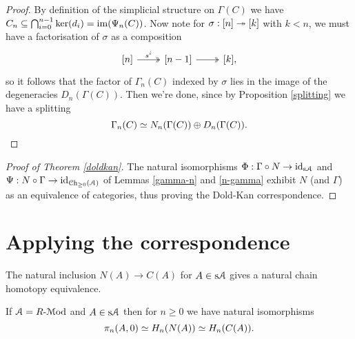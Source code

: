 \begin{proof}
  By definition of the simplicial structure on $\Gamma(C)$ we have
  $C_n \subseteq \bigcap_{i=0}^{n-1} \ker(d_i) = \operatorname{im}(\Psi_n(C))$. Now
  note for $\sigma : [n] \twoheadrightarrow [k]$ with $k < n$, we must have a
  factorisation of $\sigma$ as a composition
  \[
  \begin{tikzcd}
    {[n]} \ar[twoheadrightarrow]{r}{s^i} & {[n-1]}
    \ar[twoheadrightarrow]{r} & {[k]},
  \end{tikzcd}
  \]
  so it follows that the factor of $\Gamma_n(C)$ indexed by $\sigma$
  lies in the image of the degeneracies $D_n(\Gamma(C))$. Then we're
  done, since by Proposition \ref{splitting} we have a splitting
  \[
  \Gamma_n(C) \simeq N_n(\Gamma(C)) \oplus D_n(\Gamma(C)). \qedhere
  \]
\end{proof}

\begin{proof}[Proof of Theorem \ref{doldkan}]
  The natural isomorphisms $\Phi : \Gamma \circ N \to \operatorname{id}_{\mathrm{s}\mathcal{A}}$ and
  $\Psi : N \circ \Gamma \to \operatorname{id}_{{\mathcal{C}\mathrm{h}}_{\ge 0}(\mathcal{A})}$ of Lemmas
  \ref{gamma-n} and \ref{n-gamma} exhibit $N$ (and $\Gamma$) as an
  equivalence of categories, thus proving the Dold-Kan correspondence.
\end{proof}


\section{Applying the correspondence}

\begin{proposition}
  The natural inclusion $N(A) \to C(A)$ for $A \in \mathrm{s}\mathcal{A}$ gives a
  natural chain homotopy equivalence.
\end{proposition}

\begin{proposition}
  If $\mathcal{A} = R\text{-}{\mathcal{M}\mathrm{od}}$ and $A \in \mathrm{s}\mathcal{A}$ then for $n \ge 0$ we have
  natural isomorphisms
  \[
  \pi_n(A,0) \simeq H_n(N(A)) \simeq H_n(C(A)).
  \]
\end{proposition}


\nocite{goerssjardine, riehl-ssets, mathew-doldkan, weibel}




